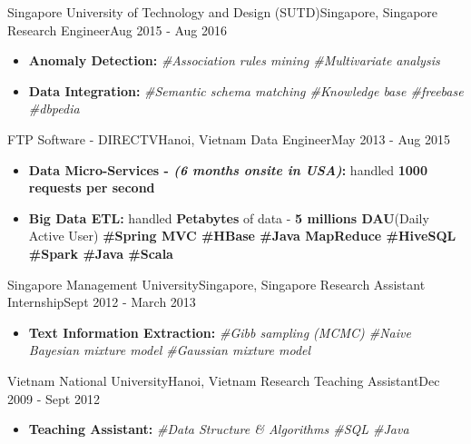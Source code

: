 \resumeSubheading
{Singapore University of Technology and Design (SUTD)}{Singapore, Singapore}
{Research Engineer}{Aug 2015 - Aug 2016}
\begin{itemize}
    \item \textbf{Anomaly Detection:} \emph{\#Association rules mining \#Multivariate analysis}
    \item \textbf{Data Integration:} \emph{\#Semantic schema matching \#Knowledge base \#freebase \#dbpedia}
\end{itemize}


\resumeSubheading
{FTP Software - DIRECTV}{Hanoi, Vietnam}
{Data Engineer}{May 2013 - Aug 2015}
\begin{itemize}
    \item \textbf{Data Micro-Services - \emph{(6 months onsite in USA)}:} handled \textbf{1000 requests per second}
    \item \textbf{Big Data ETL:} handled \textbf{Petabytes} of data - \textbf{5 millions DAU}(Daily Active User)
    \textbf{\scriptsize{\#Spring MVC \#HBase \#Java MapReduce \#HiveSQL \#Spark \#Java \#Scala}}
\end{itemize}


\resumeSubheading
{Singapore Management University}{Singapore, Singapore}
{Research Assistant Internship}{Sept 2012 - March 2013}
\begin{itemize}
    \item \textbf{Text Information Extraction:} \emph{\#Gibb sampling (MCMC) \#Naive Bayesian mixture model \#Gaussian mixture model}
\end{itemize}


\resumeSubheading
{Vietnam National University}{Hanoi, Vietnam}
{Research Teaching Assistant}{Dec 2009 - Sept 2012}
\begin{itemize}
    \item \textbf{Teaching Assistant:} \emph{\#Data Structure \& Algorithms \#SQL \#Java}
\end{itemize}

\resumeSubHeadingListEnd